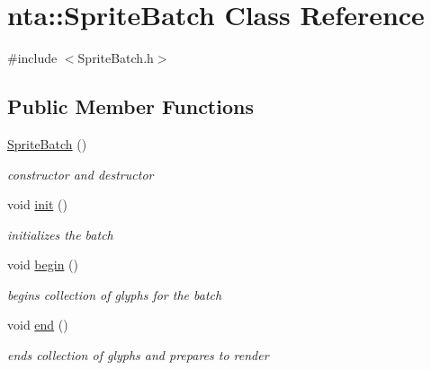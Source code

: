 \hypertarget{classnta_1_1SpriteBatch}{}\section{nta\+:\+:Sprite\+Batch Class Reference}
\label{classnta_1_1SpriteBatch}


{\ttfamily \#include $<$Sprite\+Batch.\+h$>$}

\subsection*{Public Member Functions}
\begin{DoxyCompactItemize}
\item 
\mbox{\label{classnta_1_1SpriteBatch_a554ec4ee678b6f97621d299e4a258f95}} 
\hyperlink{classnta_1_1SpriteBatch_a554ec4ee678b6f97621d299e4a258f95}{Sprite\+Batch} ()
\begin{DoxyCompactList}\small\item\em constructor and destructor \end{DoxyCompactList}\item 
\mbox{\label{classnta_1_1SpriteBatch_a91cb54c5e459f9cb0142f7d4b6e3272c}} 
void \hyperlink{classnta_1_1SpriteBatch_a91cb54c5e459f9cb0142f7d4b6e3272c}{init} ()
\begin{DoxyCompactList}\small\item\em initializes the batch \end{DoxyCompactList}\item 
\mbox{\label{classnta_1_1SpriteBatch_a8ceff37f4b281bfb1f627876bb420978}} 
void \hyperlink{classnta_1_1SpriteBatch_a8ceff37f4b281bfb1f627876bb420978}{begin} ()
\begin{DoxyCompactList}\small\item\em begins collection of glyphs for the batch \end{DoxyCompactList}\item 
\mbox{\label{classnta_1_1SpriteBatch_abadacd5bfcfc6ed0cf5a4470a22010ed}} 
void \hyperlink{classnta_1_1SpriteBatch_abadacd5bfcfc6ed0cf5a4470a22010ed}{end} ()
\begin{DoxyCompactList}\small\item\em ends collection of glyphs and prepares to render \end{DoxyCompactList}\item 

\end{DoxyCompactItemize}
